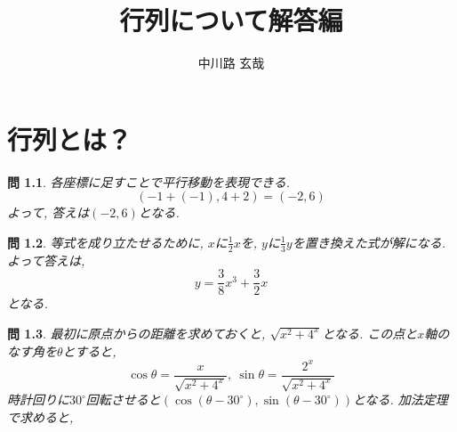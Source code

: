 \documentclass[a4paper,12pt]{jreport}
\title{行列について解答編}
\author{中川路 玄哉}
\newtheorem{problem}{問}[chapter]
\theoremstyle{definition}
\newcommand{\ang}[1]{#1^\circ}
\begin{document}
\chapter{行列とは？}
\begin{problem}
  各座標に足すことで平行移動を表現できる.
  $$
  (-1+(-1),4+2)=(-2,6)
  $$
  よって, 答えは$(-2,6)$となる.
\end{problem}
\begin{problem}
  等式を成り立たせるために, $x$に$\frac{1}{2}x$を, $y$に$\frac{1}{3}y$を置き換えた式が解になる.
  よって答えは, 
  $$y=\frac{3}{8}x^3+\frac{3}{2}x$$
  となる.
\end{problem}
\begin{problem}
  最初に原点からの距離を求めておくと, $\sqrt{x^2+4^{x}}$となる.
  この点と$x$軸のなす角を$\theta$とすると, 
  $$
  \cos\theta=\frac{x}{\sqrt{x^2+4^{x}}},\ \sin\theta=\frac{2^x}{\sqrt{x^2+4^{x}}}
  $$
  時計回りに$\ang{30}$回転させると$(\cos(\theta - \ang{30}), \sin(\theta - \ang{30}))$となる.
  加法定理で求めると, 
\end{problem}
\end{document}

